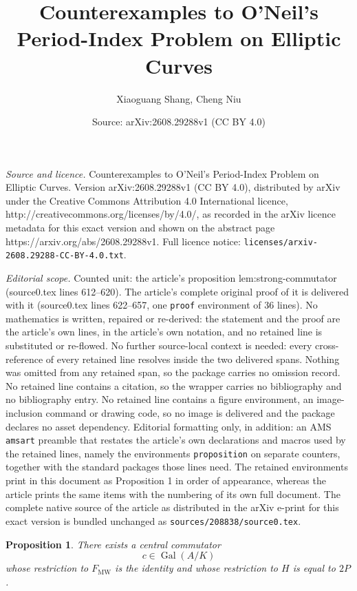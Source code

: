 \documentclass[10pt,a4paper]{amsart}
\title{Counterexamples to O'Neil's Period-Index Problem on Elliptic Curves}
\author{Xiaoguang Shang, Cheng Niu}
\date{Source: arXiv:2608.29288v1 (CC BY 4.0)}
\newtheorem{proposition}{Proposition}
\newcommand{\Gal}{\operatorname{Gal}}
\begin{document}
\maketitle

\noindent\emph{Source and licence.} Counterexamples to O'Neil's Period-Index Problem on Elliptic Curves. Version arXiv:2608.29288v1 (CC BY 4.0), distributed by arXiv under the Creative Commons Attribution 4.0 International licence, http://creativecommons.org/licenses/by/4.0/, as recorded in the arXiv licence metadata for this exact version and shown on the abstract page https://arxiv.org/abs/2608.29288v1. Full licence notice: \texttt{licenses/arxiv-2608.29288-CC-BY-4.0.txt}.\par\smallskip

\noindent\textit{Editorial scope.} Counted unit: the article's proposition lem:strong-commutator (source0.tex lines 612--620). The article's complete original proof of it is delivered with it (source0.tex lines 622--657, one \texttt{proof} environment of 36 lines). No mathematics is written, repaired or re-derived: the statement and the proof are the article's own lines, in the article's own notation, and no retained line is substituted or re-flowed.  No further source-local context is needed: every cross-reference of every retained line resolves inside the two delivered spans.  Nothing was omitted from any retained span, so the package carries no omission record.  No retained line contains a citation, so the wrapper carries no bibliography and no bibliography entry.  No retained line contains a figure environment, an image-inclusion command or drawing code, so no image is delivered and the package declares no asset dependency.  Editorial formatting only, in addition: an AMS \texttt{amsart} preamble that restates the article's own declarations and macros used by the retained lines, namely the environments \texttt{proposition} on separate counters, together with the standard packages those lines need.  The retained environments print in this document as Proposition 1 in order of appearance, whereas the article prints the same items with the numbering of its own full document.  The complete native source of the article as distributed in the arXiv e-print for this exact version is bundled unchanged as \texttt{sources/208838/source0.tex}.
\begin{proposition}
	\label{lem:strong-commutator}
	There exists a central commutator
	\[
	c\in\Gal(A/K)
	\]
	whose restriction to $F_{\mathrm{MW}}$ is the identity and whose
	restriction to $H$ is equal to $2P$.
\end{proposition}
\end{document}
